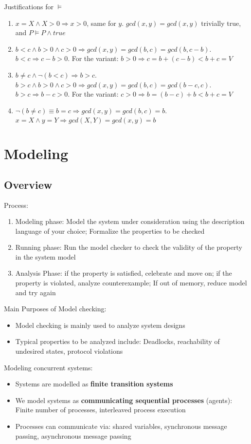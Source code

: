 \documentclass{article}
\begin{document}
\begin{enumerate}
    Justifications for $\vDash$
    \begin{enumerate}[label=(\arabic*)]
        \item $x=X \land X > 0 \Rightarrow x>0$, same for $y$. $gcd(x,y)=gcd(x,y)$ trivially true, and $P \vDash P \land true$
        \item $b < c \land b > 0 \land c >0 \Rightarrow gcd(x,y)=gcd(b,c)=gcd(b, c-b)$. $b<c \Rightarrow c-b>0$. 
        For the variant: $b>0 \Rightarrow c = b +(c-b) < b+c = V$
        \item $b \neq c \land \lnot(b<c) \Rightarrow b>c.$  $b > c  \land b > 0 \land c >0 \Rightarrow gcd(x,y)=gcd(b,c)=gcd(b-c, c)$. $b>c \Rightarrow b-c>0$. 
        For the variant: $c>0 \Rightarrow b = (b-c)+b < b+c = V$
        \item $\lnot(b \neq c) \equiv b = c \Rightarrow gcd(x,y)=gcd(b,c)=b$. $x=X \land y=Y \Rightarrow gcd(X,Y)=gcd(x,y)=b$
    \end{enumerate}
\end{enumerate}

\section{Modeling}

\subsection{Overview}
Process: 
\begin{enumerate}
    \item Modeling phase: Model the system under consideration using the description language of your choice;
    Formalize the properties to be checked
    \item Running phase: Run the model checker to check the validity of the property in the system model
    \item Analysis Phase: if the property is satisfied, celebrate and move on; if the property is violated, analyze counterexample;
    If out of memory, reduce model and try again
\end{enumerate}
\smallskip
Main Purposes of Model checking:
\begin{itemize}
    \item Model checking is mainly used to analyze system designs
    \item Typical properties to be analyzed include: Deadlocks, reachability of undesired states, protocol violations
\end{itemize}
\smallskip
Modeling concurrent systems:
\begin{itemize}
    \item Systems are modelled as \textbf{finite transition systems}
    \item We model systems as \textbf{communicating sequential processes} (agents): Finite number of processes, interleaved process execution
    \item Processes can communicate via: shared variables, synchronous message passing, asynchronous message passing
\end{itemize}
\end{document}
